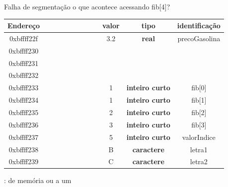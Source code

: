 \documentclass[portuguese,10pt,xcolor=table]{bredelebeamer}
\begin{document}
		\begin{frame}{Falha de segmentação}
			o que acontece acessando fib[4]?
			\tiny
			\setlength{\tabcolsep}{0pt}	
			\begin{table}
				\begin{tabular}{|@{\hskip 0.2cm}c@{\hskip 0.2cm}|c|c|c|c|c|c|c|c|c|c|@{\hskip 0.2cm}c@{\hskip 0.2cm}|}
					\hline
					\textbf{Endereço} & & & & & & & & & \textbf{valor} & \textbf{tipo} & \textbf{identificação}\\\hline
					0xbffff22f & \RN[1]&\RN[1]&\RN[0]&\RN[1]&\RN[1]&\RN[1]&\RN[0]&\RN[1]& 3.2 & \textbf{real} & precoGasolina\\\hline
					0xbffff230 & \RN[1]&\RN[1]&\RN[0]&\RN[0]&\RN[1]&\RN[1]&\RN[0]&\RN[0]& & & \\\hline
					0xbffff231 & \RN[0]&\RN[1]&\RN[0]&\RN[0]&\RN[1]&\RN[1]&\RN[0]&\RN[0]& & & \\\hline
					0xbffff232 & \RN[0]&\RN[1]&\RN[0]&\RN[0]&\RN[0]&\RN[0]&\RN[0]&\RN[0]& & & \\\hline
					0xbffff233 & \BN[0]&\BN[1]&\BN[0]&\BN[0]&\BN[1]&\BN[0]&\BN[0]&\BN[1]& 1 & \textbf{inteiro curto} & fib[0]\\\hline
					0xbffff234 & \BN[0]&\BN[1]&\BN[0]&\BN[0]&\BN[1]&\BN[1]&\BN[0]&\BN[1]& 1 & \textbf{inteiro curto} & fib[1]\\\hline
					0xbffff235 & \BN[0]&\BN[1]&\BN[0]&\BN[0]&\BN[0]&\BN[1]&\BN[0]&\BN[0]& 2 & \textbf{inteiro curto} & fib[2]\\\hline
					0xbffff236 & \BN[0]&\BN[0]&\BN[1]&\BN[1]&\BN[0]&\BN[0]&\BN[0]&\BN[0]& 3 & \textbf{inteiro curto} & fib[3]\\\hline
					0xbffff237 & \GN[0]&\GN[0]&\GN[0]&\GN[0]&\GN[0]&\GN[1]&\GN[0]&\GN[1]& 5 & \textbf{inteiro curto} & valorIndice\\\hline
					0xbffff238 & \BN[0]&\BN[1]&\BN[0]&\BN[0]&\BN[0]&\BN[0]&\BN[1]&\BN[0]& B & \textbf{caractere} & letra1\\\hline
					0xbffff239 & \BN[0]&\BN[1]&\BN[0]&\BN[0]&\BN[0]&\BN[0]&\BN[1]&\BN[1]& C & \textbf{caractere} & letra2\\\hline
				\end{tabular}
			\end{table}
			\normalsize
			\bcattention {} :  de memória ou a um 
		\end{frame}


		
\end{document}

